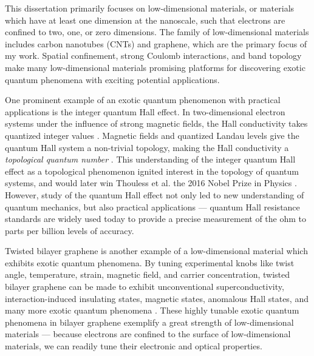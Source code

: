 \documentclass{beavtex_dub_edit}
\begin{document}
This dissertation primarily focuses on low-dimensional materials, or materials which have at least one dimension at the nanoscale, such that electrons are confined to two, one, or zero dimensions. The family of low-dimensional materials includes carbon nanotubes (CNTs) and graphene, which are the primary focus of my work. Spatial confinement, strong Coulomb interactions, and band topology make many low-dimensional materials promising platforms for discovering exotic quantum phenomena with exciting potential applications.

One prominent example of an exotic quantum phenomenon with practical applications is the integer quantum Hall effect. In two-dimensional electron systems under the influence of strong magnetic fields, the Hall conductivity takes quantized integer values \cite{wakabayashi_hall_1978}. Magnetic fields and quantized Landau levels give the quantum Hall system a non-trivial topology, making the Hall conductivity a \textit{topological quantum number} \cite{thouless_quantized_1982}. This understanding of the integer quantum Hall effect as a topological phenomenon ignited interest in the topology of quantum systems, and would later win Thouless et al. the 2016 Nobel Prize in Physics \cite{noauthor_nobel_nodate}. However, study of the quantum Hall effect not only led to new understanding of quantum mechanics, but also practical applications — quantum Hall resistance standards are widely used today to provide a precise measurement of the ohm to parts per billion levels of accuracy. 

Twisted bilayer graphene is another example of a low-dimensional material which exhibits exotic quantum phenomena. By tuning experimental knobs like twist angle, temperature, strain, magnetic field, and carrier concentration, twisted bilayer graphene can be made to exhibit unconventional superconductivity, interaction-induced insulating states, magnetic states, anomalous Hall states, and many more exotic quantum phenomena \cite{andrei_graphene_2020}. These highly tunable exotic quantum phenomena in bilayer graphene exemplify a great strength of low-dimensional materials — because electrons are confined to the surface of low-dimensional materials, we can readily tune their electronic and optical properties.
\end{document}
